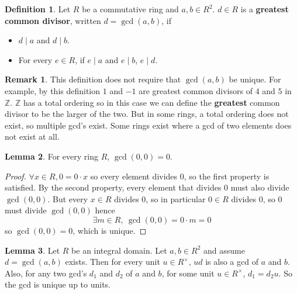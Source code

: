 \documentclass[12pt,a4paper]{article}
\theoremstyle{definition}
\newtheorem{definition}{Definition}[subsection]
\newtheorem{lemma}[definition]{Lemma}
\newtheorem*{remark}{Remark}
\begin{document}
\begin{definition}\label{def:gcd}
	Let $R$ be a commutative ring and $a, b \in R^2$. $d \in R$ is a \textbf{greatest common divisor}, written $d = \gcd(a, b)$, if
	\begin{itemize}
		\item $d \mid a$ and $d \mid b$.
		\item For every $e \in R$, if $e \mid a$ and $e \mid b$, $e \mid d$.
	\end{itemize}
\end{definition}

\begin{remark}
	This definition does not require that $\gcd(a, b)$ be unique. For example, by this definition $1$ and $-1$ are greatest common divisors of $4$ and $5$ in $\mathbb{Z}$. $\mathbb{Z}$ has a total ordering so in this case we can define the \textbf{greatest} common divisor to be the larger of the two. But in some rings, a total ordering does not exist, so multiple gcd's exist. Some rings exist where a gcd of two elements does not exist at all.
\end{remark}

\begin{lemma}
	For every ring $R$, $\gcd(0, 0) = 0$.
\end{lemma}

\begin{proof}
	$\forall x \in R, 0 = 0 \cdot x$ so every element divides $0$, so the first property is satisfied. By the second property, every element that divides $0$ must also divide $\gcd(0, 0)$. But every $x \in R$ divides $0$, so in particular $0 \in R$ divides $0$, so $0$ must divide $\gcd(0, 0)$ hence
	\[
		\exists m \in R, \ \gcd(0, 0) = 0 \cdot m = 0
	\]
	so $\gcd(0, 0) = 0$, which is unique.
\end{proof}

\begin{lemma}\label{lem:gcdUniqueUpToUnits}
	Let $R$ be an integral domain. Let $a, b \in R^2$ and assume $d = \gcd(a, b)$ exists. Then for every unit $u \in R^{\times}$, $ud$ is also a gcd of $a$ and $b$. Also, for any two gcd's $d_1$ and $d_2$ of $a$ and $b$, for some unit $u \in R^{\times}$, $d_1 = d_2 u$. So the gcd is unique up to units.
\end{lemma}
\end{document}
